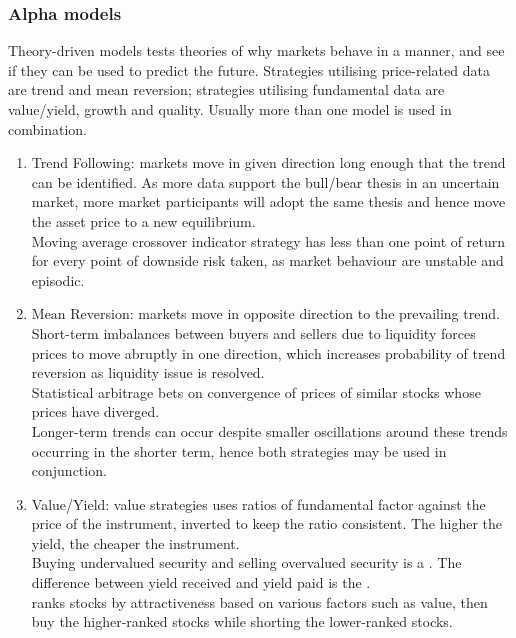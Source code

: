 \subsubsection{Alpha models}

Theory-driven models tests theories of why markets behave in a manner, and see if they can be used to predict the future. Strategies utilising price-related data are trend and mean reversion; strategies utilising fundamental data are value/yield, growth and quality. Usually more than one model is used in combination.

\begin{definition} 
\begin{enumerate}[label=\roman*.]
\setlength{\itemsep}{0pt}
\item Trend Following: markets move in given direction long enough that the trend can be identified. As more data support the bull/bear thesis in an uncertain market, more market participants will adopt the same thesis and hence move the asset price to a new equilibrium.\\
Moving average crossover indicator strategy has less than one point of return for every point of downside risk taken, as market behaviour are unstable and episodic.
\item Mean Reversion: markets move in opposite direction to the prevailing trend. Short-term imbalances between buyers and sellers due to liquidity forces prices to move abruptly in one direction, which increases probability of trend reversion as liquidity issue is resolved.\\
Statistical arbitrage bets on convergence of prices of similar stocks whose prices have diverged.\\
Longer-term trends can occur despite smaller oscillations around these trends occurring in the shorter term, hence both strategies may be used in conjunction.
\item Value/Yield:  value strategies uses ratios of fundamental factor against the price of the instrument, inverted to keep the ratio consistent. The higher the yield, the cheaper the instrument.\\
Buying undervalued security and selling overvalued security is a . The difference between yield received and yield paid is the .\\
 ranks stocks by attractiveness based on various factors such as value, then buy the higher-ranked stocks while shorting the lower-ranked stocks.

\end{enumerate}
\end{definition}
